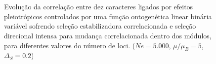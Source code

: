 \begin{figure}[htbp]
    \\
    \vspace{-18pt}
    \vspace{11pt}
    \\
    \caption{Evolução da correlação entre dez caracteres ligados por efeitos
        pleiotrópicos controlados por uma função ontogenética linear binária
        variável sofrendo seleção estabilizadora correlacionada e seleção
        direcional intensa para mudança correlacionada dentro dos módulos,
        para diferentes valores do número de loci. ($Ne=5.000$, $\mu/\mu_B=5$, $\Delta_S=0.2$)}
    \label{MB}
\end{figure}

